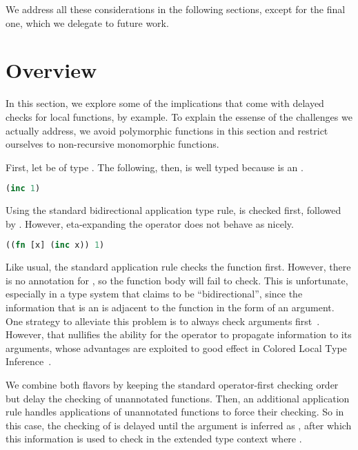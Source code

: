 We address all these considerations in the following sections, except
for the final one, which we delegate to future work. %

\section{Overview}
\label{symbolic:section:overview}

In this section, we explore some of the implications that come with delayed checks for local functions,
by example.
To explain the essense of the challenges we actually address, we avoid polymorphic functions in this section
and restrict ourselves to non-recursive monomorphic functions.

First, let  be of type .
The following, then, is well typed because  is an .

\begin{lstlisting}[language=Clojure]
(inc 1)
\end{lstlisting}

Using the standard bidirectional application type rule,  is checked first,
followed by .
However, eta-expanding the operator does not behave as nicely.

\begin{lstlisting}[language=Clojure]
((fn [x] (inc x)) 1)
\end{lstlisting}

Like usual, the standard application rule checks the function first.
However, there is no annotation for , so the function body will fail
to check.
This is unfortunate, especially in a type system that claims to be ``bidirectional'',
since the information that  is an  is adjacent to the function
in the form of an argument.
One strategy to alleviate this problem is to always check arguments first~\cite{xie2018let}.
However, that nullifies the ability for the operator to propagate information
to its arguments, whose advantages are exploited to good effect in Colored Local Type Inference~\cite{coloredlti01}.

We combine both flavors by keeping the standard operator-first checking order
but delay the checking of unannotated functions.
Then, an additional application rule handles applications of
unannotated functions to force their checking.
So in this case, the checking of 
is delayed until the argument  is inferred as ,
after which this information is used to check 
in the extended type context where .

